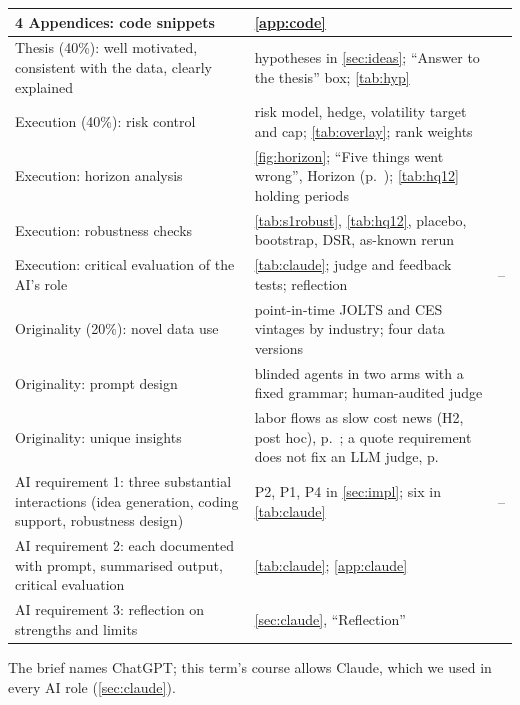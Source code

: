 \begin{table}[H]
\begin{tabularx}{\textwidth}{@{}p{6.3cm} X r@{}}
4 Appendices: code snippets & \cref{app:code} & \pageref{app:code} \\
\midrule
Thesis (40\%): well motivated, consistent with the data, clearly explained & hypotheses in \cref{sec:ideas}; ``Answer to the thesis'' box; \cref{tab:hyp} & \pageref{sec:ideas} \\
Execution (40\%): risk control & risk model, hedge, volatility target and cap; \cref{tab:overlay}; rank weights & \pageref{par:risk} \\
Execution: horizon analysis & \cref{fig:horizon}; ``Five things went wrong'', Horizon (p.~\pageref{sec:s1}); \cref{tab:hq12} holding periods & \pageref{fig:horizon} \\
Execution: robustness checks & \cref{tab:s1robust}, \cref{tab:hq12}, placebo, bootstrap, DSR, as-known rerun & \pageref{tab:s1robust} \\
Execution: critical evaluation of the AI's role & \cref{tab:claude}; judge and feedback tests; reflection & \pageref{sec:claude}--\pageref{par:reflection} \\
Originality (20\%): novel data use & point-in-time JOLTS and CES vintages by industry; four data versions & \pageref{sec:data} \\
Originality: prompt design & blinded agents in two arms with a fixed grammar; human-audited judge & \pageref{sec:ai} \\
Originality: unique insights & labor flows as slow cost news (H2, post hoc), p.~\pageref{sec:survives}; a quote requirement does not fix an LLM judge, p.~\pageref{sec:claude} & \pageref{sec:survives} \\
\midrule
AI requirement 1: three substantial interactions (idea generation, coding support, robustness design) & P2, P1, P4 in \cref{sec:impl}; six in \cref{tab:claude} & \pageref{sec:ai}--\pageref{box:p4} \\
AI requirement 2: each documented with prompt, summarised output, critical evaluation & \cref{tab:claude}; \cref{app:claude} & \pageref{tab:claude} \\
AI requirement 3: reflection on strengths and limits & \cref{sec:claude}, ``Reflection'' & \pageref{par:reflection} \\
\bottomrule
\end{tabularx}
\end{table}
The brief names ChatGPT; this term's course allows Claude, which we used in every AI role (\cref{sec:claude}).


